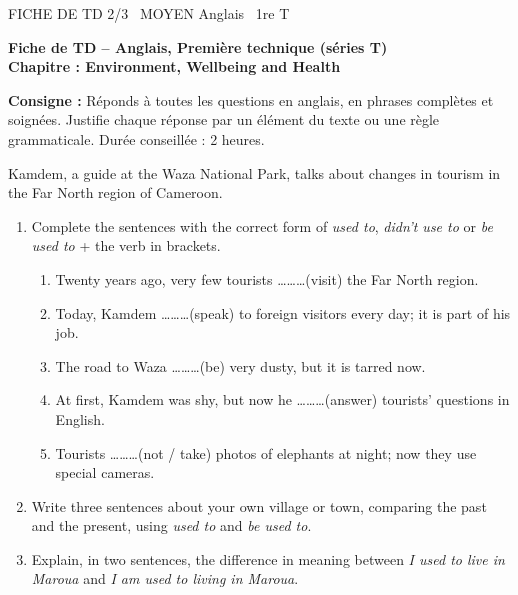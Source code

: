 \documentclass[11pt]{article}
\begin{document}
\begin{tcolorbox}[enhanced,colback=popink,colframe=popink,arc=10pt,boxrule=0pt,left=12pt,right=12pt,top=9pt,bottom=9pt]
{\color{white}\popxbold\small FICHE DE TD 2/3 \textbullet\ MOYEN \hfill Anglais \textbullet\ 1re T\par}
\end{tcolorbox}
\vspace{4pt}
\textbf{Fiche de TD -- Anglais, Première technique (séries T)}\\
\textbf{Chapitre : Environment, Wellbeing and Health}

\medskip
\noindent\textbf{Consigne :} Réponds à toutes les questions en anglais, en phrases complètes et soignées. Justifie chaque réponse par un élément du texte ou une règle grammaticale. Durée conseillée : 2 heures.

\begin{exercice}
Kamdem, a guide at the Waza National Park, talks about changes in tourism in the Far North region of Cameroon.
\begin{enumerate}
\item Complete the sentences with the correct form of \textit{used to}, \textit{didn't use to} or \textit{be used to} + the verb in brackets.
\begin{enumerate}
\item Twenty years ago, very few tourists \ldots\ldots\ldots (visit) the Far North region.
\item Today, Kamdem \ldots\ldots\ldots (speak) to foreign visitors every day; it is part of his job.
\item The road to Waza \ldots\ldots\ldots (be) very dusty, but it is tarred now.
\item At first, Kamdem was shy, but now he \ldots\ldots\ldots (answer) tourists' questions in English.
\item Tourists \ldots\ldots\ldots (not / take) photos of elephants at night; now they use special cameras.
\end{enumerate}
\item Write three sentences about your own village or town, comparing the past and the present, using \textit{used to} and \textit{be used to}.
\item Explain, in two sentences, the difference in meaning between \textit{I used to live in Maroua} and \textit{I am used to living in Maroua}.
\end{enumerate}
\end{exercice}
\end{document}
